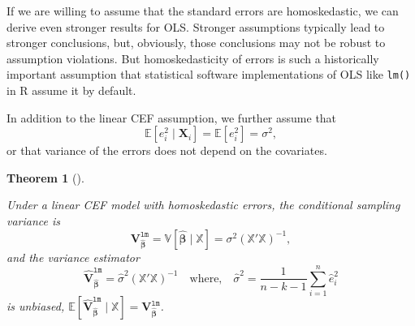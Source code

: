 \documentclass[
  13pt,
  letterpaper,
  DIV=11,
  numbers=noendperiod]{scrreprt}
\newcommand{\mb}{\symbf}
\newcommand{\E}{\mathbb{E}}
\newcommand{\V}{\mathbb{V}}
\newcommand{\X}{\mb{X}}
\newcommand{\Xmat}{\mathbb{X}}
\newcommand{\bhat}{\widehat{\mb{\beta}}}
\theoremstyle{plain}
\newtheorem{theorem}{Theorem}[chapter]
\theoremstyle{definition}
\theoremstyle{definition}
\theoremstyle{remark}
\begin{document}
If we are willing to assume that the standard errors are homoskedastic,
we can derive even stronger results for OLS. Stronger assumptions
typically lead to stronger conclusions, but, obviously, those
conclusions may not be robust to assumption violations. But
homoskedasticity of errors is such a historically important assumption
that statistical software implementations of OLS like \texttt{lm()} in R
assume it by default.

\begin{tcolorbox}[enhanced jigsaw, title=\textcolor{quarto-callout-note-color}{\faInfo}\hspace{0.5em}{Assumption: Homoskedasticity with a linear CEF}, breakable, colbacktitle=quarto-callout-note-color!10!white, toptitle=1mm, colback=white, arc=.35mm, left=2mm, opacityback=0, titlerule=0mm, colframe=quarto-callout-note-color-frame, leftrule=.75mm, coltitle=black, opacitybacktitle=0.6, bottomtitle=1mm, rightrule=.15mm, bottomrule=.15mm, toprule=.15mm]

In addition to the linear CEF assumption, we further assume that \[
\E[e_i^2 \mid \X_i] = \E[e_i^2] = \sigma^2,
\] or that variance of the errors does not depend on the covariates.

\end{tcolorbox}

\begin{theorem}[]\protect\hypertarget{thm-homoskedasticity}{}\label{thm-homoskedasticity}

Under a linear CEF model with homoskedastic errors, the conditional
sampling variance is \[
\mb{V}^{\texttt{lm}}_{\bhat} = \V[\bhat \mid \Xmat] = \sigma^2 \left( \Xmat'\Xmat \right)^{-1},
\] and the variance estimator \[
\widehat{\mb{V}}^{\texttt{lm}}_{\bhat} = \widehat{\sigma}^2 \left( \Xmat'\Xmat \right)^{-1} \quad\text{where,}\quad \widehat{\sigma}^2 = \frac{1}{n - k - 1} \sum_{i=1}^n \widehat{e}_i^2
\] is unbiased,
\(\E[\widehat{\mb{V}}^{\texttt{lm}}_{\bhat} \mid \Xmat] = \mb{V}^{\texttt{lm}}_{\bhat}\).

\end{theorem}
\end{document}
